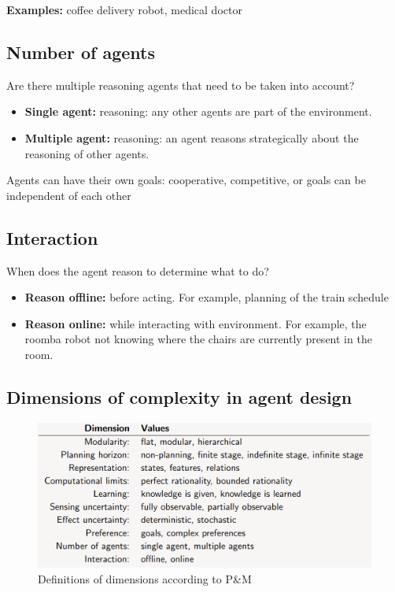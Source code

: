 \documentclass[12pt]{article}
\begin{document}
\noindent \textbf{Examples:} coffee delivery robot, medical doctor

\subsection{Number of agents}
Are there multiple reasoning agents that need to be taken into account?

\begin{itemize}
    \item \textbf{Single agent:} reasoning: any other agents are part of the environment.
    \item \textbf{Multiple agent:} reasoning: an agent reasons strategically about the reasoning of other
agents.
\end{itemize}

\noindent Agents can have their own goals: cooperative, competitive, or goals can be independent of
each other

\subsection{Interaction}
When does the agent reason to determine what to do?

\begin{itemize}
    \item \textbf{Reason offline:} before acting. For example, planning of the train schedule
    \item \textbf{Reason online:} while interacting with environment. For example, the roomba robot not knowing where the chairs are currently present in the room.
\end{itemize}

\newpage
\subsection{Dimensions of complexity in agent design}

\begin{figure}[h!]
        \centering
        \includegraphics[scale=0.4]{definition-dimensions.png}
        \caption{Definitions of dimensions according to P\&M}
        \label{fig:my_label}
\end{figure}
\end{document}
